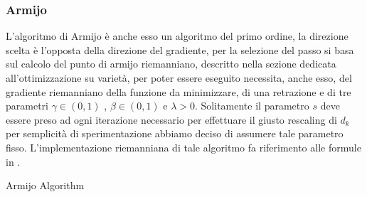 \documentclass[a4paper, 12pt]{article}
\begin{document}
\subsubsection{Armijo}
L'algoritmo di Armijo è anche esso un algoritmo del primo ordine, la direzione scelta è l'opposta della direzione del gradiente, per la selezione del passo si basa sul calcolo del punto di armijo riemanniano, descritto nella sezione dedicata all'ottimizzazione su varietà, per poter essere eseguito necessita, anche esso, del gradiente riemanniano della funzione da minimizzare, di una retrazione e di tre parametri $\gamma \in (0,1)$ , $\beta \in (0,1)$ e $\lambda > 0$. Solitamente il parametro $s$ deve essere preso ad ogni iterazione necessario per effettuare il giusto rescaling di $d_k$ per semplicità di sperimentazione abbiamo deciso di assumere tale parametro fisso. L'implementazione riemanniana di tale algoritmo fa riferimento alle formule in \cite{Iannazzo}.\\
\begin{center}
\begin{algorithm}[H]
\SetAlgoLined
{}
\caption{Armijo Algorithm}
\end{algorithm}
\end{center}
\end{document}
